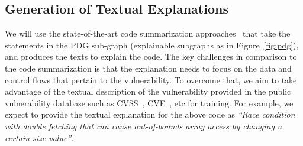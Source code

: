 \subsection{Generation of Textual Explanations}
\label{sec:tex}

We will use the state-of-the-art code summarization
approaches~\cite{shi-etal-2021-cast,chai2022pyramid} that take the
statements in the PDG sub-graph (explainable subgraphs as in
Figure~\ref{fig:pdg}), and produces the texts to explain the code. The
key challenges in comparison to the code summarization is that the
explanation needs to focus on the data and control flows that pertain
to the vulnerability. To overcome that, we aim to take advantage of
the textual description of the vulnerability provided in the public
vulnerability database such as CVSS~\cite{first-website},
CVE~\cite{cve}, etc for training. For example, we expect to provide
the textual explanation for the above code as {\em ``Race condition
  with double fetching that can cause out-of-bounds array access by
  changing a certain size value''}.

